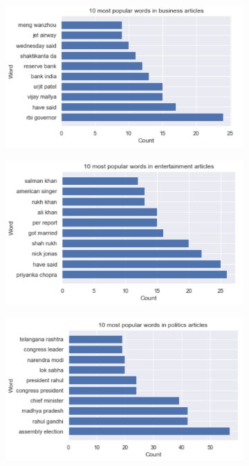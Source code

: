 \begin{figure}[H]
     \centering
     \begin{subfigure}[b]{0.7\textwidth}
         \centering
         \includegraphics[width=\textwidth]{images/analiza/business_bigram.png}
     \end{subfigure}
     \hfill
     \begin{subfigure}[b]{0.7\textwidth}
         \centering
         \includegraphics[width=\textwidth]{images/analiza/entertainment_bigram.png}
     \end{subfigure}
     \hfill
     \begin{subfigure}[b]{0.7\textwidth}
         \centering
         \includegraphics[width=\textwidth]{images/analiza/politics_bigram.png}
     \end{subfigure}
\end{figure}
